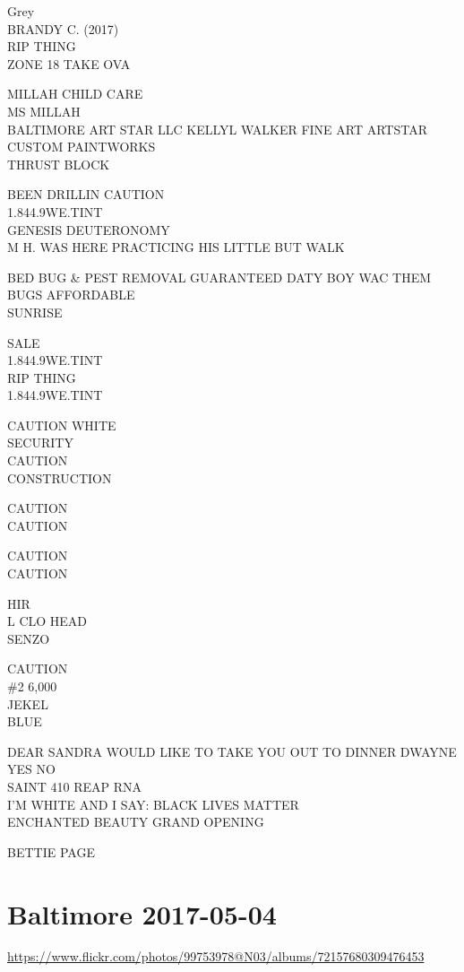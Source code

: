 \documentclass[10pt,letterpaper]{article}
\begin{document}
Grey\\
BRANDY C. (2017)\\
RIP THING\\
ZONE 18 TAKE OVA

MILLAH CHILD CARE\\
MS MILLAH\\
BALTIMORE ART STAR LLC KELLYL WALKER FINE ART ARTSTAR CUSTOM PAINTWORKS\\
THRUST BLOCK

BEEN DRILLIN CAUTION\\
1.844.9WE.TINT\\
GENESIS DEUTERONOMY\\
M H. WAS HERE PRACTICING HIS LITTLE BUT WALK

BED BUG \& PEST REMOVAL GUARANTEED DATY BOY WAC THEM BUGS AFFORDABLE\\
SUNRISE

SALE\\
1.844.9WE.TINT\\
RIP THING\\
1.844.9WE.TINT

CAUTION WHITE\\
SECURITY\\
CAUTION\\
CONSTRUCTION

CAUTION\\
CAUTION

CAUTION\\
CAUTION

HIR\\
L CLO HEAD\\
SENZO

CAUTION\\
\#2 6,000\\
JEKEL\\
BLUE

DEAR SANDRA WOULD LIKE TO TAKE YOU OUT TO DINNER DWAYNE YES NO\\
SAINT 410 REAP RNA\\
I'M WHITE AND I SAY: BLACK LIVES MATTER\\
ENCHANTED BEAUTY GRAND OPENING

BETTIE PAGE


\section*{Baltimore 2017-05-04}

\url{https://www.flickr.com/photos/99753978@N03/albums/72157680309476453}
\end{document}
